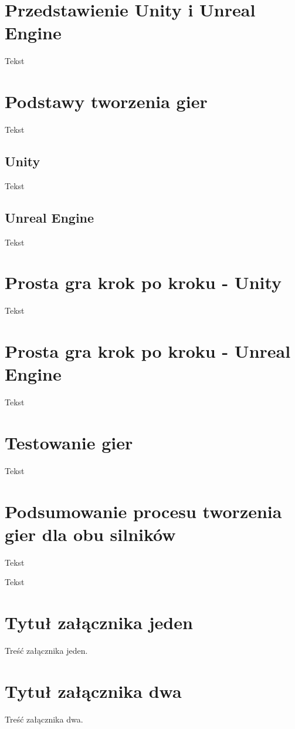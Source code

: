\documentclass[brudnopis]{xmgr}
\begin{document}
\chapter{Przedstawienie Unity i Unreal Engine}

Tekst

\chapter{Podstawy tworzenia gier}

Tekst

\section{Unity}

Tekst

\section{Unreal Engine}

Tekst

\chapter{Prosta gra krok po kroku - Unity}

Tekst

\chapter{Prosta gra krok po kroku - Unreal Engine}

Tekst

\chapter{Testowanie gier}

Tekst

\chapter{Podsumowanie procesu tworzenia gier dla obu silników}

Tekst

\summary
Tekst

\appendix
\chapter{Tytuł załącznika jeden}

Treść załącznika jeden.

\chapter{Tytuł załącznika dwa}

Treść załącznika dwa.




\listoftables

\listoffigures

\oswiadczenie
\end{document}
